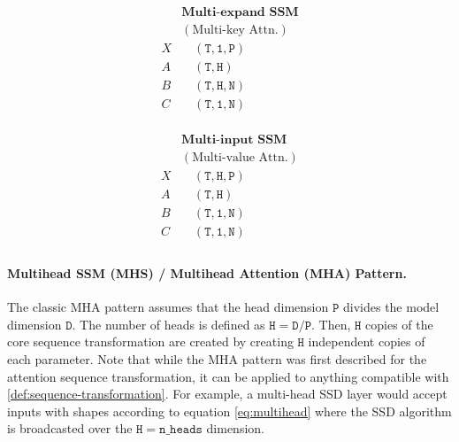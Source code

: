\begin{minipage}[t]{.25\linewidth}
  \begin{equation}
    \label{eq:multikey}
    \begin{aligned}
    & \textbf{Multi-expand SSM} \\
    & (\textrm{Multi-key Attn.}) \\
      X & \quad \mathtt{(T, 1, P)} \\
      A & \quad \mathtt{(T, H)} \\
      B & \quad \mathtt{(T, H, N)} \\
      C & \quad \mathtt{(T, 1, N)} \\
    \end{aligned}
  \end{equation}
\end{minipage}

\begin{minipage}[t]{.25\linewidth}
  \begin{equation}
    \label{eq:multivalue}
    \begin{aligned}
    & \textbf{Multi-input SSM} \\
    & (\textrm{Multi-value Attn.}) \\
      X & \quad \mathtt{(T, H, P)} \\
      A & \quad \mathtt{(T, H)} \\
      B & \quad \mathtt{(T, 1, N)} \\
      C & \quad \mathtt{(T, 1, N)} \\
    \end{aligned}
  \end{equation}
\end{minipage}

\paragraph{Multihead SSM (MHS) / Multihead Attention (MHA) Pattern.}

The classic MHA pattern assumes that the head dimension $\mathtt{P}$ divides the model dimension $\mathtt{D}$.
The number of heads is defined as $\mathtt{H} = \mathtt{D} / \mathtt{P}$.
Then, $\mathtt{H}$ copies of the core sequence transformation are created by creating $\mathtt{H}$ independent copies of each parameter. Note that while the MHA pattern was first described for the attention sequence transformation, it can be applied to anything compatible with \ref{def:sequence-transformation}.
For example, a multi-head SSD layer would accept inputs with shapes according to equation \eqref{eq:multihead}
where the SSD algorithm is broadcasted over the $\mathtt{H} = \mathtt{n\_heads}$ dimension.

